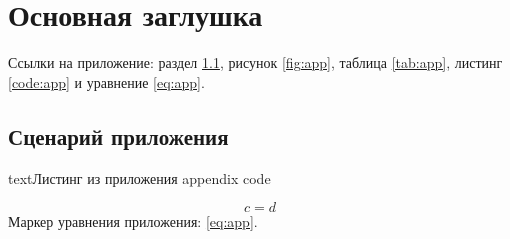 \documentclass[a4paper,12pt]{report}
\begin{document}
\chapter{Основная заглушка}
Ссылки на приложение: раздел \ref{app:one}, рисунок \ref{fig:app}, таблица \ref{tab:app}, листинг \ref{code:app} и уравнение \eqref{eq:app}.
\appendixChapter
\section{Сценарий приложения}\label{app:one}
\begin{code}{text}{Листинг из приложения}
appendix code
\end{code}
\begin{equation}
  \label{eq:app}
  c = d
\end{equation}
Маркер уравнения приложения: \eqref{eq:app}.
\end{document}
